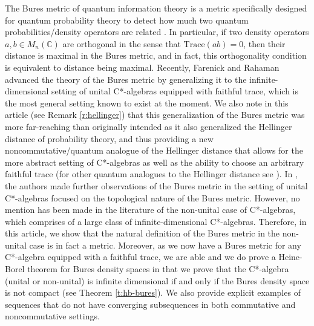 \documentclass{amsart}
\theoremstyle{plain}
\theoremstyle{definition}
\theoremstyle{remark}
\numberwithin{equation}{section}
\newcommand{\C}{{\mathds{C}}}
\begin{document}
The Bures metric \cite{Bures} of quantum information theory  is a metric specifically designed for quantum probability theory to detect how much two quantum probabilities/density operators are related \cite{Hayashi}.  In particular, if two density operators $a,b\in M_n(\C)$ are orthogonal in the sense that $\mathrm{Trace}(ab)=0$, then their distance is maximal in the Bures metric, and in fact, this orthogonality condition is equivalent to distance being maximal. Recently, Farenick and Rahaman \cite{Farenick-Rahaman17} advanced the theory of the Bures metric by generalizing it to the infinite-dimensional setting of unital C*-algebras equipped with faithful trace, which is the most general setting known to exist at the moment. We also note in this article (see Remark \ref{r:hellinger})  that this generalization of the Bures metric was more far-reaching than originally intended as it also generalized the Hellinger distance \cite{Hellinger} 
of probability theory, and thus providing a new noncommutative/quantum analogue of the Hellinger distance  that allows for the more abstract setting of C*-algebras as well as the ability to choose an arbitrary faithful trace  (for other quantum analogues to the Hellinger distance see \cite{Bhatia, Pitrik}). In \cite{Aguilar25}, the authors made further observations of the Bures metric in the setting of unital C*-algebras focused on the topological nature of the Bures metric. However, no mention has been made in the literature of the non-unital case of C*-algebras, which comprises of a large class of infinite-dimensional C*-algebras. Therefore, in this article, we show that the natural definition of the Bures metric in the non-unital case is in fact a metric. Moreover, as we now have a Bures metric for any C*-algebra equipped with a faithful trace, we are able and we do prove a Heine-Borel theorem for Bures density spaces in that we prove that the C*-algebra (unital or non-unital) is infinite dimensional if and only if the Bures density space is not compact (see Theorem \ref{t:hb-bures}). We also  provide explicit examples  of sequences that do not have converging subsequences in both commutative and noncommutative settings.
\end{document}
